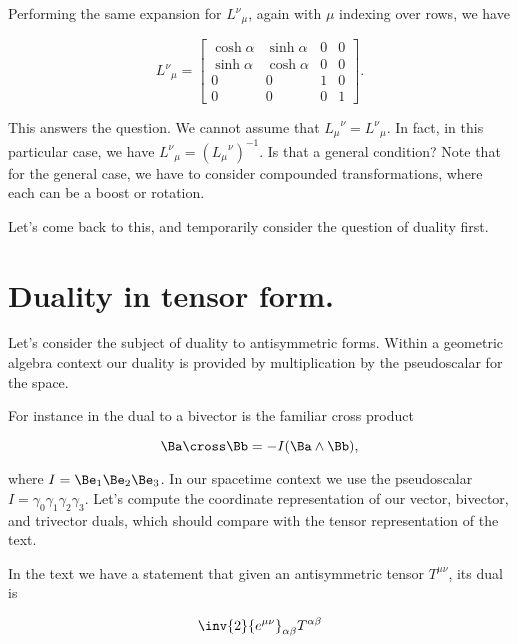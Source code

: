 Performing the same expansion for ${L^\nu}_\mu$, again with $\mu$ indexing over rows, we have

\begin{equation}\label{eqn:antisymmetricTensorTx:470}
{L^\nu}_\mu =
\begin{bmatrix}
\cosh \alpha & \sinh \alpha & 0 & 0 \\
\sinh \alpha & \cosh \alpha & 0 & 0 \\
0 & 0 & 1 & 0 \\
0 & 0 & 0 & 1
\end{bmatrix}.
\end{equation}

This answers the question.  We cannot assume that ${L_\mu}^\nu = {L^\nu}_\mu$.  In fact, in this particular case, we have ${L^\nu}_\mu = ({L_\mu}^\nu)^{-1}$.  Is that a general condition?  Note that for the general case, we have to consider compounded transformations, where each can be a boost or rotation.

Let's come back to this, and temporarily consider the question of duality first.

\section{Duality in tensor form.}

Let's consider the subject of duality to antisymmetric forms.  Within a geometric algebra context our duality is provided by multiplication by the pseudoscalar for the space.

For instance in  the dual to a bivector is the familiar cross product

\begin{equation}\label{eqn:antisymmetricTensorTx:500}
\Ba \cross \Bb = -I (\Ba \wedge \Bb),
\end{equation}

where $I = \Be_1 \Be_2 \Be_3$.  In our spacetime context we use the pseudoscalar $I = \gamma_0 \gamma_1 \gamma_2 \gamma_3$.  Let's compute the coordinate representation of our vector, bivector, and trivector duals, which should compare with the tensor representation of the text.

In the text we have a statement that given an antisymmetric tensor $T^{\mu \nu}$, its dual is

\begin{equation}\label{eqn:antisymmetricTensorTx:510}
\inv{2} {e^{\mu \nu}}_{\alpha \beta} T^{\alpha \beta}
\end{equation}

